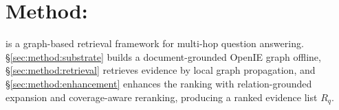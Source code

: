 %
%
%

\section{Method: \methodname{}}
\label{sec:method}

\methodname{} is a graph-based retrieval framework for multi-hop question
answering. \S\ref{sec:method:substrate} builds a document-grounded
OpenIE graph offline, \S\ref{sec:method:retrieval} retrieves evidence by
local graph propagation, and \S\ref{sec:method:enhancement} enhances the
ranking with relation-grounded expansion and coverage-aware reranking,
producing a ranked evidence list $R_q$.

